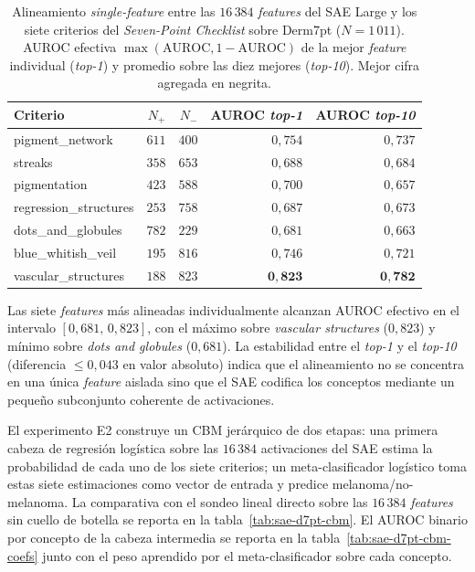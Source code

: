 \begin{table}[H]
\centering
\footnotesize
\setlength{\tabcolsep}{4pt}
\renewcommand{\arraystretch}{0.95}
\caption{Alineamiento \emph{single-feature} entre las
$16\,384$ \emph{features} del SAE Large y los siete criterios
del \emph{Seven-Point Checklist} sobre Derm7pt
($N = 1\,011$). AUROC efectiva
$\max(\mathrm{AUROC}, 1-\mathrm{AUROC})$ de la mejor
\emph{feature} individual (\emph{top-1}) y promedio sobre las
diez mejores (\emph{top-10}). Mejor cifra agregada en negrita.}
\label{tab:sae-d7pt-e1}
\begin{tabular}{lrrrr}
\hline
Criterio                 & $N_{+}$ & $N_{-}$ & AUROC \emph{top-1} & AUROC \emph{top-10} \\
\hline
pigment\_network         & $611$ & $400$ & $0{,}754$ & $0{,}737$ \\
streaks                  & $358$ & $653$ & $0{,}688$ & $0{,}684$ \\
pigmentation             & $423$ & $588$ & $0{,}700$ & $0{,}657$ \\
regression\_structures   & $253$ & $758$ & $0{,}687$ & $0{,}673$ \\
dots\_and\_globules      & $782$ & $229$ & $0{,}681$ & $0{,}663$ \\
blue\_whitish\_veil      & $195$ & $816$ & $0{,}746$ & $0{,}721$ \\
vascular\_structures     & $188$ & $823$ & $\mathbf{0{,}823}$ & $\mathbf{0{,}782}$ \\
\hline
\end{tabular}
\end{table}

Las siete \emph{features} más alineadas individualmente alcanzan
AUROC efectivo en el intervalo $[0{,}681,\,0{,}823]$, con el
máximo sobre \emph{vascular structures} ($0{,}823$) y mínimo sobre
\emph{dots and globules} ($0{,}681$). La estabilidad entre el
\emph{top-1} y el \emph{top-10} (diferencia $\leq 0{,}043$ en
valor absoluto) indica que el alineamiento no se concentra en una
única \emph{feature} aislada sino que el SAE codifica los
conceptos mediante un pequeño subconjunto coherente de
activaciones.

El experimento E2 construye un CBM jerárquico de dos etapas:
una primera cabeza de regresión logística sobre las
$16\,384$ activaciones del SAE estima la probabilidad de cada
uno de los siete criterios; un meta-clasificador logístico toma
estas siete estimaciones como vector de entrada y predice
melanoma/no-melanoma. La comparativa con el sondeo lineal directo
sobre las $16\,384$ \emph{features} sin cuello de botella se
reporta en la tabla~\ref{tab:sae-d7pt-cbm}. El AUROC binario por
concepto de la cabeza intermedia se reporta en la
tabla~\ref{tab:sae-d7pt-cbm-coefs} junto con el peso aprendido
por el meta-clasificador sobre cada concepto.


